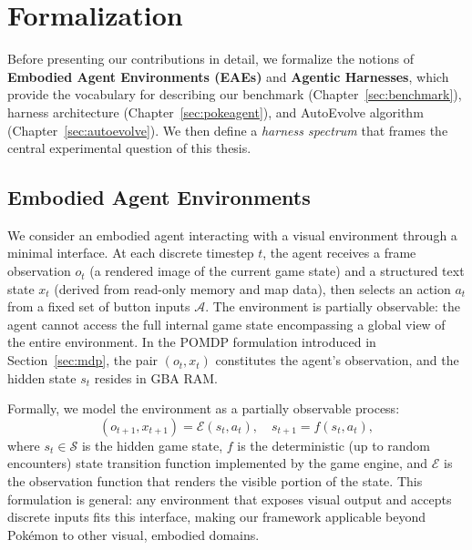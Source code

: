 
\section{Formalization}\label{sec:formalization}

Before presenting our contributions in detail, we formalize the notions of \textbf{Embodied Agent Environments (EAEs)} and \textbf{Agentic Harnesses}, which provide the vocabulary for describing our benchmark (Chapter~\ref{sec:benchmark}), harness architecture (Chapter~\ref{sec:pokeagent}), and AutoEvolve algorithm (Chapter~\ref{sec:autoevolve}). We then define a \emph{harness spectrum} that frames the central experimental question of this thesis.

\subsection{Embodied Agent Environments}\label{sec:formal_env}

We consider an embodied agent interacting with a visual environment through a minimal interface. At each discrete timestep $t$, the agent receives a frame observation $o_t$ (a rendered image of the current game state) and a structured text state $x_t$ (derived from read-only memory and map data), then selects an action $a_t$ from a fixed set of button inputs $\mathcal{A}$. The environment is partially observable: the agent cannot access the full internal game state encompassing a global view of the entire environment. In the POMDP formulation introduced in Section~\ref{sec:mdp}, the pair $(o_t, x_t)$ constitutes the agent's observation, and the hidden state $s_t$ resides in GBA RAM.

Formally, we model the environment as a partially observable process:
\begin{equation}\label{eq:env}
    (o_{t+1}, x_{t+1}) = \mathcal{E}(s_t, a_t), \quad s_{t+1} = f(s_t, a_t),
\end{equation}
where $s_t \in \mathcal{S}$ is the hidden game state, $f$ is the deterministic (up to random encounters) state transition function implemented by the game engine, and $\mathcal{E}$ is the observation function that renders the visible portion of the state. This formulation is general: any environment that exposes visual output and accepts discrete inputs fits this interface, making our framework applicable beyond Pok\'{e}mon to other visual, embodied domains.

